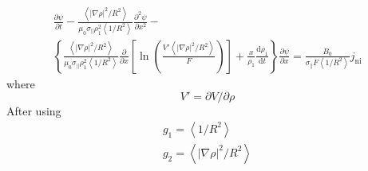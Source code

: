 \begin{equation}
\begin{array}{*{20}{c}}
  {\frac{{\partial \psi }}{{\partial t}} - \frac{{\left\langle {{{\left| {\nabla \rho } \right|}^2}/{R^2}} \right\rangle }}{{{\mu _0}{\sigma _\parallel }\rho _{\text{1}}^2\left\langle {1/{R^2}} \right\rangle }}\frac{{{\partial ^2}\psi }}{{\partial {x^2}}} - } \\ 
  {\left\{ {\frac{{\left\langle {{{\left| {\nabla \rho } \right|}^2}/{R^2}} \right\rangle }}{{{\mu _0}{\sigma _\parallel }\rho _{\text{1}}^2\left\langle {1/{R^2}} \right\rangle }}\frac{\partial }{{\partial x}}\left[ {\ln \left( {\frac{{V'\left\langle {{{\left| {\nabla \rho } \right|}^2}{\text{/}}{R^2}} \right\rangle }}{F}} \right)} \right] + \frac{x}{{{\rho _{\text{1}}}}}\frac{{{\text{d}}{\rho _{\text{1}}}}}{{{\text{d}}t}}} \right\}\frac{{\partial \psi }}{{\partial x}} = \frac{{{B_0}}}{{{\sigma _\parallel }F\left\langle {1{\text{/}}{R^2}} \right\rangle }}{j_{{\text{ni}}}}} 
\end{array}
\end{equation}
where
\begin{equation}
V' = \partial V/\partial \rho 
\end{equation}
After using
\begin{equation}
\begin{array}{*{20}{c}}
  {{g_1} = \left\langle {1/{R^2}} \right\rangle } \\ 
  {{g_2} = \left\langle {{{\left| {\nabla \rho } \right|}^2}/{R^2}} \right\rangle } 
\end{array}
\end{equation}
